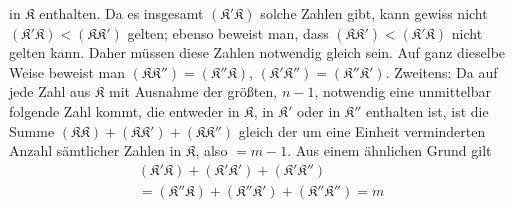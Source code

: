 in \(\mathfrak K\) enthalten. Da es insgesamt \((\mathfrak K'\mathfrak K)\) solche Zahlen gibt, kann gewiss nicht \((\mathfrak K'\mathfrak K)<(\mathfrak K\mathfrak K')\) gelten; ebenso beweist man, dass \((\mathfrak K\mathfrak K')<(\mathfrak K'\mathfrak K)\) nicht gelten kann. Daher müssen diese Zahlen notwendig gleich sein. Auf ganz dieselbe Weise beweist man \((\mathfrak K\mathfrak K'')=(\mathfrak K''\mathfrak K)\), \((\mathfrak K'\mathfrak K'')=(\mathfrak K''\mathfrak K')\). Zweitens: Da auf jede Zahl aus \(\mathfrak K\) mit Ausnahme der größten, \(n-1\), notwendig eine unmittelbar folgende Zahl kommt, die entweder in \(\mathfrak K\), in \(\mathfrak K'\) oder in \(\mathfrak K''\) enthalten ist, ist die Summe \((\mathfrak K\mathfrak K)+(\mathfrak K\mathfrak K')+(\mathfrak K\mathfrak K'')\) gleich der um eine Einheit verminderten Anzahl sämtlicher Zahlen in \(\mathfrak K\), also \(=m-1\). Aus einem ähnlichen Grund gilt \[\begin{aligned}(\mathfrak K'\mathfrak K)+(\mathfrak K'\mathfrak K')+(\mathfrak K'\mathfrak K'')\\{}=(\mathfrak K''\mathfrak K)+(\mathfrak K''\mathfrak K')+(\mathfrak K''\mathfrak K'')=m\end{aligned}\]

